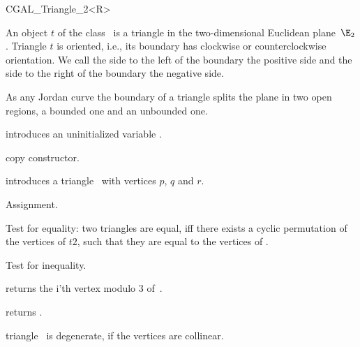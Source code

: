 

\begin {classtemplate} {CGAL_Triangle_2<R>}

  An object $t$ of the class \classname\ is a triangle 
in the two-dimensional Euclidean plane~$\E_2$. 
Triangle  $t$  is oriented, i.e., its boundary has
clockwise or counterclockwise orientation. We call the side to the left
of the boundary the positive side and the side to the right of the
boundary the negative side.

As any Jordan curve the boundary of a triangle splits the plane in
two open regions, a bounded one and an unbounded one. 

\creation
{}


\hidden {}
             {introduces an uninitialized variable \var.}

\hidden {}
 	    {copy constructor.}


\def\CCalternateThreeColumn{\CCtrue}
            {introduces a triangle \var\ with vertices $p$,  $q$ and $r$.}


\operations
\threecolumns{4.5cm}{4cm}

\hidden {}
        {Assignment.}

       {Test for equality: two triangles are equal, iff there exists a 
        cyclic permutation of the vertices of $t2$, such that they are 
        equal to the vertices of \var.}

       {Test for inequality.}



       {returns the i'th vertex modulo 3  of~\var.}

       {returns .}


       {triangle \var\ is degenerate, if the vertices are collinear.}



\end{classtemplate}
